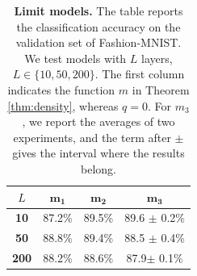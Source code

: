 \documentclass{article}
\theoremstyle{plain}
\theoremstyle{definition}
\theoremstyle{definition}
\theoremstyle{remark}
\theoremstyle{definition}
\theoremstyle{definition}
\theoremstyle{remark}
\numberwithin{equation}{section}
\begin{document}
\begin{table}[h!]
  \centering
  \caption{\textbf{Limit models.} The table reports the classification accuracy on the validation set of Fashion-MNIST. We test models with $L$ layers, $L\in\{10,50,200\}$. The first column indicates the function $m$ in Theorem \ref{thm:density}, whereas $q=0$. For $m_3$, we report the averages of two experiments, and the term after $\pm$ gives the interval where the results belong.}\label{tab:conv_limit_2}
  \vspace{10pt}
  \setlength{\tabcolsep}{10pt}                %
  \begin{tabular}{c|ccc}
    \toprule
    $L$ & $\mathbf{m_{1}}$ & $\mathbf{m_{2}}$ & $\mathbf{m_{3}}$ \\   
    \midrule
    \textbf{10} & 87.2\% & 89.5\% & 89.6 $\pm$ 0.2\%\\
    \textbf{50} & 88.8\% & 89.4\% & 88.5 $\pm$ 0.4\%\\
    \textbf{200} & 88.2\% & 88.6\% & 87.9$\pm$ 0.1\%\\
    \bottomrule
  \end{tabular}
\end{table}


\end{document}
